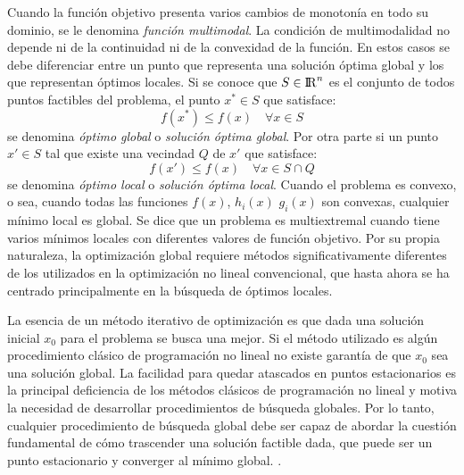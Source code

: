 Cuando la función objetivo presenta varios cambios de monotonía en todo su dominio, se le denomina \textit{función multimodal}. La condición de multimodalidad no depende ni de la continuidad ni de la convexidad de la función. En estos casos se debe diferenciar entre un punto que representa una solución óptima global y los que representan óptimos locales. Si se conoce que $S \in {\rm I\!R}^{n}$ es el conjunto de todos puntos factibles del problema, el punto $x^* \in S$  que satisface:
\begin{equation}
f(x^*) \leq f(x) \quad \forall x \in S
\end{equation}
se denomina \textit{óptimo global} o \textit{solución óptima global}. Por otra parte si un punto $x' \in S$  tal que existe una vecindad $Q$ de $x'$ que satisface:
\begin{equation}
f(x') \leq f(x) \quad \forall x \in S \cap Q
\end{equation}
se denomina \textit{óptimo local} o \textit{solución óptima local}. Cuando el problema es convexo, o sea, cuando todas las funciones $f(x)$, $h_i(x)$ $g_i(x)$ son convexas, cualquier mínimo local es global. Se dice que un problema es multiextremal cuando tiene varios mínimos locales con diferentes valores de función objetivo. Por su propia naturaleza, la optimización global requiere métodos significativamente diferentes de los utilizados en la optimización no lineal convencional, que hasta ahora se ha centrado principalmente en la búsqueda de óptimos locales.

La esencia de un método iterativo de optimización es que dada una solución inicial $x_0$ para el problema se busca una mejor. Si el método utilizado es algún procedimiento clásico de programación no lineal no existe garantía de que $x_0$ sea una solución global. La facilidad para quedar atascados en puntos estacionarios es la principal deficiencia de los métodos clásicos de programación no lineal y motiva la necesidad de desarrollar procedimientos de búsqueda globales. Por lo tanto, cualquier procedimiento de búsqueda global debe ser capaz de abordar la cuestión fundamental de cómo trascender una solución factible dada, que puede ser un punto estacionario y converger al mínimo global.
\cite{tuy_convex_2015}.

